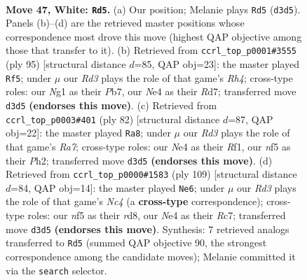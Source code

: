 \documentclass[11pt]{article}
\begin{document}
\clearpage

\begin{figure}[p]\centering
\begin{subfigure}{0.46\textwidth}\centering
\resizebox{\linewidth}{!}{%
\newchessgame
\chessboard[
  setfen={4k1r1/6br/4n3/5nPp/P3N3/R2R4/5KP1/6N1 w - - 3 47},
  showmover=false,
  pgfstyle=straightmove, color=movearrow, markmove={d3-d5}
]}
\caption{}
\end{subfigure}\hfill
\begin{subfigure}{0.46\textwidth}\centering
\resizebox{\linewidth}{!}{%
\newchessgame
\chessboard[
  setfen={8/1p1r1k2/p2p1p2/7r/3B4/P2K1N2/1P6/5R2 b - - 6 48},
  showmover=false,
  pgfstyle=straightmove, color=movearrow, markmove={h5-f5}
]}
\caption{}
\end{subfigure}
\\[4pt]
\begin{subfigure}{0.46\textwidth}\centering
\resizebox{\linewidth}{!}{%
\newchessgame
\chessboard[
  setfen={3b2k1/R5pp/8/8/8/P4PP1/3rn2P/5R1K w - - 6 42},
  showmover=false,
  pgfstyle=straightmove, color=movearrow, markmove={a7-a8}
]}
\caption{}
\end{subfigure}\hfill
\begin{subfigure}{0.46\textwidth}\centering
\resizebox{\linewidth}{!}{%
\newchessgame
\chessboard[
  setfen={3R4/2r3k1/6p1/1nn4p/8/4N1P1/5PK1/3B4 b - - 1 55},
  showmover=false,
  pgfstyle=straightmove, color=movearrow, markmove={c5-e6}
]}
\caption{}
\end{subfigure}
\caption{\textbf{Move 47, White: \texttt{Rd5}.} (a) Our position; Melanie plays \texttt{Rd5} (\texttt{d3d5}). Panels (b)--(d) are the retrieved master positions whose correspondence most drove this move (highest QAP objective among those that transfer to it). (b) Retrieved from \texttt{ccrl\_top\_p0001\#3555} (ply 95) [structural distance $d$=85, QAP obj=23]: the master played \texttt{Rf5}; under $\mu$ our \emph{Rd3} plays the role of that game's \emph{Rh4}; cross-type roles: our \emph{N}g1 as their \emph{P}b7, our \emph{N}e4 as their \emph{R}d7; transferred move \texttt{d3d5} \textbf{(endorses this move)}. (c) Retrieved from \texttt{ccrl\_top\_p0003\#401} (ply 82) [structural distance $d$=87, QAP obj=22]: the master played \texttt{Ra8}; under $\mu$ our \emph{Rd3} plays the role of that game's \emph{Ra7}; cross-type roles: our \emph{N}e4 as their \emph{R}f1, our \emph{n}f5 as their \emph{P}h2; transferred move \texttt{d3d5} \textbf{(endorses this move)}. (d) Retrieved from \texttt{ccrl\_top\_p0000\#1583} (ply 109) [structural distance $d$=84, QAP obj=14]: the master played \texttt{Ne6}; under $\mu$ our \emph{Rd3} plays the role of that game's \emph{Nc4} (a \textbf{cross-type} correspondence); cross-type roles: our \emph{n}f5 as their \emph{r}d8, our \emph{N}e4 as their \emph{R}c7; transferred move \texttt{d3d5} \textbf{(endorses this move)}. Synthesis: 7 retrieved analogs transferred to \texttt{Rd5} (summed QAP objective 90, the strongest correspondence among the candidate moves); Melanie committed it via the \texttt{search} selector.}
\label{fig:thought-m92}
\end{figure}
\end{document}
